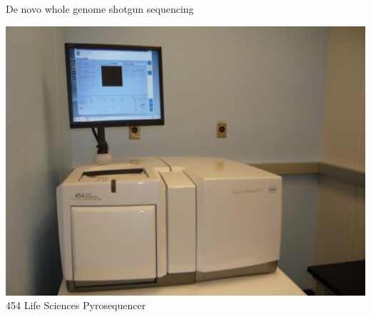 \documentclass[xcolor=dvipsnames]{beamer}
\begin{document}
\begin{frame}{De novo whole genome shotgun sequencing}
\begin{minipage}{0.32\textwidth}
\begin{center}
            \vspace{0.2cm}
            \includegraphics[width=1.0\textwidth]{454_Sequencer.jpg} \\
                454 Life Sciences Pyrosequencer \\
        \end{center}
    \end{minipage}
\end{frame}
\end{document}
